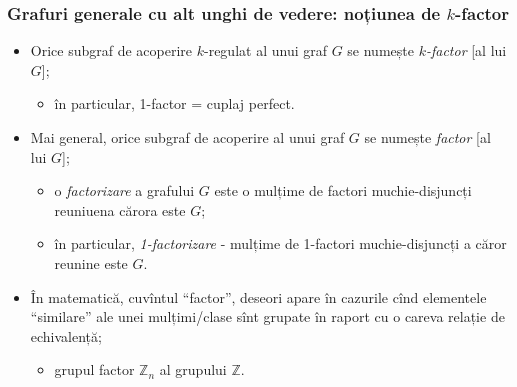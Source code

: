 \begin{frame}
  \frametitle{Grafuri generale cu alt unghi de vedere: noțiunea de $k$-factor}

\begin{itemize}[<+->]
  \item Orice subgraf de acoperire $k$-regulat al unui graf $G$ se numește \emph{$k$-factor} [al lui $G$];
    \begin{itemize}
      \item în particular, \alert{1-factor = cuplaj perfect}.
    \end{itemize}
  \item Mai general, orice subgraf de acoperire al unui graf $G$ se numește \emph{factor} [al lui $G$];
    \begin{itemize}
      \item o \emph{factorizare} a grafului $G$ este o mulțime de factori muchie-disjuncți reuniuena cărora este $G$;
      \item în particular, \emph{1-factorizare} - mulțime de 1-factori muchie-disjuncți a căror reunine este $G$.
    \end{itemize}
  \item În matematică, cuvîntul ``factor'', deseori apare în cazurile cînd elementele ``similare'' ale unei mulțimi/clase sînt grupate în raport cu o careva relație de echivalență;
    \begin{itemize}
      \item grupul factor $\mathbb{Z}_n$ al grupului $\mathbb{Z}$.
    \end{itemize}
\end{itemize}


\end{frame}

